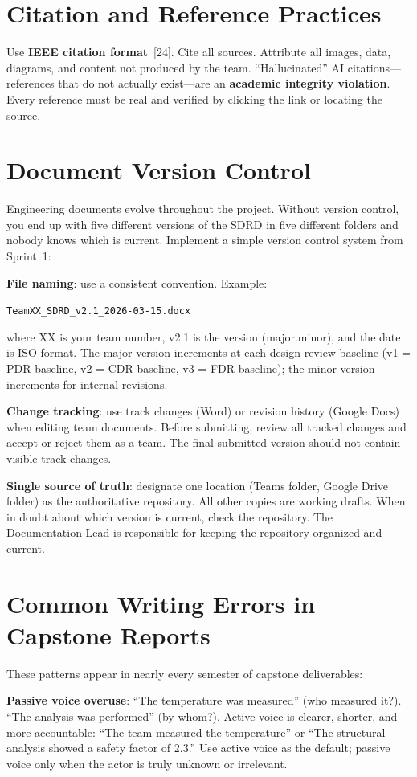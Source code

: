 \section{Citation and Reference Practices}
Use \textbf{IEEE citation format}~[24]. Cite all sources. Attribute all images, data, diagrams, and content not produced by the team. ``Hallucinated'' AI citations---references that do not actually exist---are an \textbf{academic integrity violation}. Every reference must be real and verified by clicking the link or locating the source.

\section{Document Version Control}
Engineering documents evolve throughout the project. Without version control, you end up with five different versions of the SDRD in five different folders and nobody knows which is current. Implement a simple version control system from Sprint~1:

\textbf{File naming}: use a consistent convention. Example:

\smallskip
\centerline{\texttt{TeamXX\_SDRD\_v2.1\_2026-03-15.docx}}
\smallskip

\noindent where XX is your team number, v2.1 is the version (major.minor), and the date is ISO format. The major version increments at each design review baseline (v1 = PDR baseline, v2 = CDR baseline, v3 = FDR baseline); the minor version increments for internal revisions.

\textbf{Change tracking}: use track changes (Word) or revision history (Google Docs) when editing team documents. Before submitting, review all tracked changes and accept or reject them as a team. The final submitted version should not contain visible track changes.

\textbf{Single source of truth}: designate one location (Teams folder, Google Drive folder) as the authoritative repository. All other copies are working drafts. When in doubt about which version is current, check the repository. The Documentation Lead is responsible for keeping the repository organized and current.

\section{Common Writing Errors in Capstone Reports}
These patterns appear in nearly every semester of capstone deliverables:

\textbf{Passive voice overuse}: ``The temperature was measured'' (who measured it?). ``The analysis was performed'' (by whom?). Active voice is clearer, shorter, and more accountable: ``The team measured the temperature'' or ``The structural analysis showed a safety factor of 2.3.'' Use active voice as the default; passive voice only when the actor is truly unknown or irrelevant.

